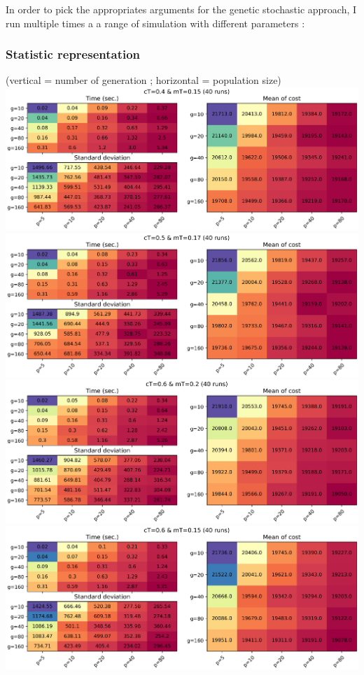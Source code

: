 \documentclass[11pt]{article}
\begin{document}
In order to pick the appropriates arguments for the genetic stochastic
approach, I run multiple times a a range of simulation with different
parameters :

\hypertarget{statistic-representation}{%
\subsubsection{Statistic
representation}\label{statistic-representation}}

\begin{center}
(vertical = number of generation ; horizontal = population size)
\includegraphics{image_genetic_table_1}
\includegraphics{image_genetic_table_2}
\includegraphics{image_genetic_table_3}
\includegraphics{image_genetic_table_4}
\end{center}
\end{document}
